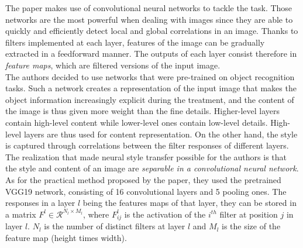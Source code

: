 \documentclass[twocolumn,superscriptaddress,aps, floatfix]{revtex4-1}
\begin{document}
    The paper \cite{DBLP:journals/corr/GatysEB15a} makes use of convolutional neural networks to tackle the task. Those networks are the most powerful when dealing with images since they are able to quickly and efficiently detect local and global correlations in an image. Thanks to filters implemented at each layer, features of the image can be gradually extracted in a feedforward manner. The outputs of each layer consist therefore in \emph{feature maps}, which are filtered versions of the input image.\\
    
    The authors decided to use networks that were pre-trained on object recognition tasks. Such a network creates a representation of the input image that makes the object information increasingly explicit during the treatment, and the content of the image is thus given more weight than the fine details. Higher-level layers contain high-level content while lower-level ones contain low-level details. High-level layers are thus used for content representation. On the other hand, the style is captured through correlations between the filter responses of different layers.\\
    
    The realization that made neural style transfer possible for the authors is that the style and content of an image are \emph{separable in a convolutional neural network}.\\
    
    As for the practical method proposed by the paper, they used the pretrained VGG19 network, consisting of 16 convolutional layers and 5 pooling ones. The responses in a layer $l$ being the features maps of that layer, they can be stored in a matrix $F^l \in \mathcal{R}^{N_l\times M_l}$, where $F_{ij}^l$ is the activation of the $i^{th}$ filter at position $j$ in layer $l$. $N_l$ is the number of distinct filters at layer $l$ and $M_l$ is the size of the feature map (height times width).\\ 
    
\end{document}
